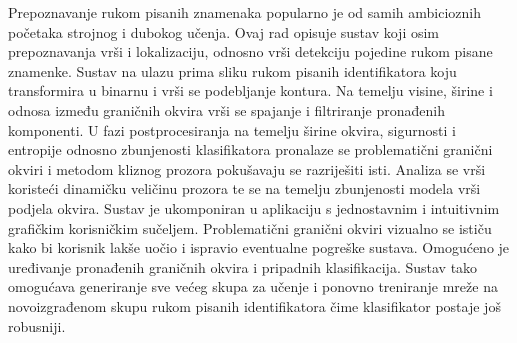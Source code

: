 \documentclass[times, utf8, diplomski]{fer}
\theoremstyle{definition}
\begin{document}
\begin{sazetak}
	Prepoznavanje rukom pisanih znamenaka popularno je od samih ambicioznih početaka strojnog i dubokog učenja. Ovaj rad opisuje sustav koji osim prepoznavanja vrši i lokalizaciju, odnosno vrši detekciju pojedine rukom pisane znamenke. Sustav na ulazu prima sliku rukom pisanih identifikatora koju transformira u binarnu i vrši se podebljanje kontura. Na temelju visine, širine i odnosa između graničnih okvira vrši se spajanje i filtriranje pronađenih komponenti. U fazi postprocesiranja na temelju širine okvira, sigurnosti i entropije odnosno zbunjenosti klasifikatora pronalaze se problematični granični okviri i metodom kliznog prozora pokušavaju se razriješiti isti. Analiza se vrši koristeći dinamičku veličinu prozora te se na temelju zbunjenosti modela vrši podjela okvira. Sustav je ukomponiran u aplikaciju s jednostavnim i intuitivnim grafičkim korisničkim sučeljem. Problematični granični okviri vizualno se ističu kako bi korisnik lakše uočio i ispravio eventualne pogreške sustava. Omogućeno je uređivanje pronađenih graničnih okvira i pripadnih klasifikacija. Sustav tako omogućava generiranje sve većeg skupa za učenje i ponovno treniranje mreže na novoizgrađenom skupu rukom pisanih identifikatora čime klasifikator postaje  još robusniji. 
	
\end{sazetak}
\newpage
\end{document}
